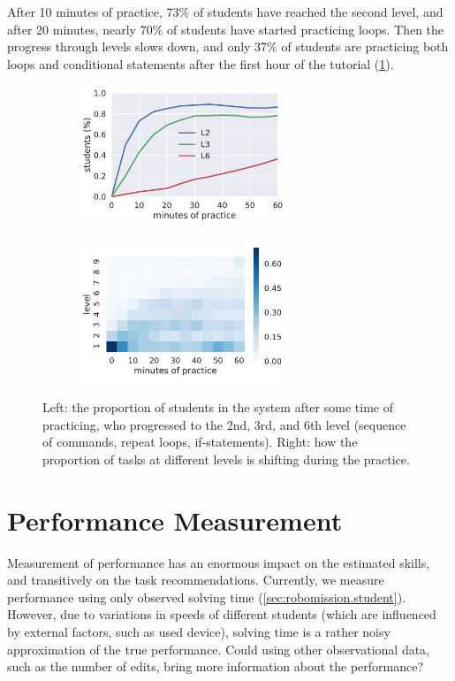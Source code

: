 After 10 minutes of practice, 73\% of students have reached the second level,
and after 20 minutes, nearly 70\% of students have started practicing loops.
Then the progress through levels slows down, and only 37\% of students
are practicing both loops and conditional statements after the first
hour of the tutorial (\cref{fig:students-at-levels}).

\begin{figure}[htb]
\centering
\begin{subfigure}{.49\textwidth}
\centering
\includegraphics[height=42mm]{img/students-at-levels}
\end{subfigure}
\begin{subfigure}{.49\textwidth}
\centering
\includegraphics[height=42mm]{img/task-sessions-at-levels}
\end{subfigure}
\caption{%
  Left: the proportion of students in the system after some time of practicing,
  who progressed to the 2nd, 3rd, and 6th level (sequence of commands, repeat loops, if-statements).
  Right: how the proportion of tasks at different levels is shifting during the practice.}
\label{fig:students-at-levels}
\end{figure}

\section{Performance Measurement}

Measurement of performance has an enormous impact on the estimated skills, %
and transitively on %
the task recommendations. %
Currently, we measure %
performance using only observed solving time
(\cref{sec:robomission.student}).
However, due to variations in speeds of different students
(which are influenced by external factors, such as used device),
solving time is a rather noisy approximation of the true performance.
Could using other observational data, such as the number of edits,
bring more information about the performance?

